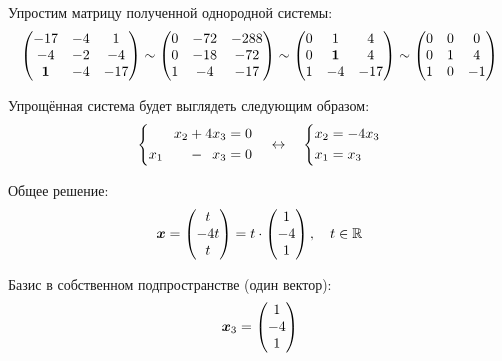 \documentclass[a4paper,12pt]{article}
\theoremstyle{remark}
\begin{document}
\begin{solution}
  Упростим матрицу полученной однородной системы:
  \[
    \begin{pmatrix}
      -17 & -4 & 1\\
      -4 & -2 & -4\\
      \boldsymbol{1} & -4 & -17
    \end{pmatrix}
    \sim \begin{pmatrix}
      0 & -72 & -288\\
      0 & -18 & -72\\
      1 & -4 & -17
    \end{pmatrix}
    \sim \begin{pmatrix}
      0 & 1 & 4\\
      0 & \boldsymbol{1} & 4\\
      1 & -4 & -17
    \end{pmatrix}
    \sim \begin{pmatrix}
      0 & 0 & 0\\
      0 & 1 & 4\\
      1 & 0 & -1
    \end{pmatrix}
  \]
  
  Упрощённая система будет выглядеть следующим образом:
  \[
    \left\{
      \begin{aligned}
        &\hphantom{x_1 +} x_2 + 4 x_3 = 0\\
        &x_1 \hphantom{+ x_2} - \hphantom{4} x_3 = 0
      \end{aligned}
    \right.
    \quad\leftrightarrow\quad \left\{
      \begin{aligned}
        &x_2 = -4 x_3\\
        &x_1 = x_3
      \end{aligned}
    \right.
  \]
  
  Общее решение:
  \[
    \boldsymbol x = \begin{pmatrix}
      t \\ -4t \\ t
    \end{pmatrix}
    = t \cdot \begin{pmatrix}
      1 \\ -4 \\ 1
    \end{pmatrix},\quad t \in \operatorname{\mathbb R}
  \]
  
  Базис в собственном подпространстве (один вектор):
  \[
    \boldsymbol x_3 = \begin{pmatrix}
      1 \\ -4 \\ 1
    \end{pmatrix}
  \]
  

\end{solution}
\end{document}
